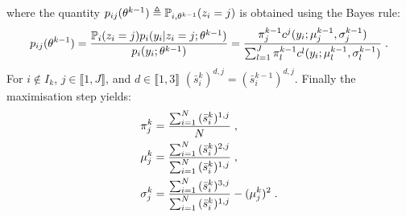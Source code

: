 \begin{exmp}
where the quantity $p_{ij}(\theta^{k-1}) \triangleq \mathbb{P}_{i,\theta^{k-1}}(z_i = j)$ is obtained using the Bayes rule:
\begin{equation}\label{gmm:condexpect}
p_{ij}(\theta^{k-1}) =\frac{\mathbb{P}_i(z_i = j)p_i(y_i|z_i=j;\theta^{k-1})}{p_i(y_i; \theta^{k-1})}=\frac{\pi_j^{k-1} c^j(y_i;\mu^{k-1}_j,\sigma^{k-1}_j)}{\sum_{l=1}^{J}\pi_l^{k-1}c^l(y_i;\mu_l^{k-1}, \sigma_l^{k-1})}\;.
\end{equation}
For $i \notin I_k$, $j \in \llbracket 1, J \rrbracket$, and $d \in \llbracket 1,3 \rrbracket$ $(\bar{s}_i^k)^{d,j} = (\bar{s}_i^{k-1})^{d,j}$.
Finally the maximisation step yields:
\begin{align}
& \pi_j^k = \frac{\sum_{i=1}^{N}{(\bar{s}_i^k)^{1,j}}}{N}\;,\\
& \mu_j^k = \frac{\sum_{i=1}^{N}{(\bar{s}_i^k)^{2,j}}}{\sum_{i=1}^{N}{(\bar{s}_i^k)^{1,j}}} \;,\\
& \sigma_j^k = \frac{\sum_{i=1}^{N}{(\bar{s}_i^k)^{3,j}}}{\sum_{i=1}^{N}{(\bar{s}_i^k)^{1,j}}} - (\mu_j^k)^2\;.
\end{align}
\end{exmp}
